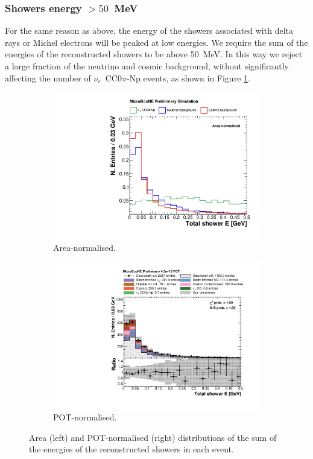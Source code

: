 \subsubsection*{Showers energy $>50$~MeV} 
For the same reason as above, the energy of the showers associated with delta rays or Michel electrons will be peaked at low energies. We require the sum of the energies of the reconstructed showers to be above 50~MeV. In this way we reject a large fraction of the neutrino and cosmic background, without significantly affecting the number of $\nu_e$~CC0$\pi$-Np events, as shown in Figure \ref{fig:shower_energy_integral}.

\begin{figure}[htbp]
\centering
  \begin{subfigure}{0.49\textwidth}
    \includegraphics[width=\linewidth]{figures/shower_energy_norm.pdf}
    \caption{Area-normalised.} \label{fig:shower_energy_integral}
  \end{subfigure}
    \begin{subfigure}{0.49\textwidth}
    \includegraphics[width=\linewidth]{figures/shower_energy_pot.pdf}
    \caption{POT-normalised.} \label{fig:shower_energy_pot}
  \end{subfigure}
  \caption{Area (left) and POT-normalised (right) distributions of the sum of the energies of the reconstructed showers in each event.}
\end{figure}


